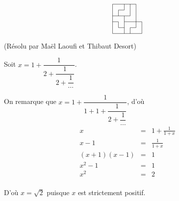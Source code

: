 \begin{sol}[34]
\[\begin{tikzpicture}[scale=0.3]
\draw (0, 0)--(0,5 );
\draw (1, 1)--(1,2 );
\draw (1, 3)--(1,4 );
\draw (2, 0)--(2,3 );
\draw (2, 4)--(2,5 );
\draw (3, 0)--(3,1 );
\draw (3, 3)--(3,5 );
\draw (4, 1)--(4,5 );
\draw (5, 0)--(5,2 );

\draw(0,0)--(5,0);
\draw(1,1)--(2,1);
\draw(3,1)--(4,1);
\draw(0,2)--(1,2);
\draw(2,2)--(5,2);
\draw(0,3)--(3,3);
\draw(1,4)--(2,4);
\draw(0,5)--(4,5);
\end{tikzpicture}\]

\end{sol}

\begin{sol}[42](Résolu par Maël Laoufi et Thibaut Desort)

Soit $x=1+\dfrac{1}{2+\dfrac{1}{2+\dfrac{1}{\cdots}}}$.

On remarque que $x=1+\dfrac{1}{1+1+\dfrac{1}{2+\dfrac{1}{\cdots}}}$, 
d'où 
\begin{eqnarray*}
x &=& 1+\frac{1}{1+x} \\
x-1 &=& \frac{1}{1+x}\\
(x+1)(x-1) &=& 1\\
x^2-1 &=& 1\\
x^2 &=& 2\\
\end{eqnarray*}

D'où $x=\sqrt{2}$ puisque $x$ est strictement positif.


\end{sol}

